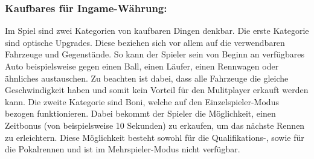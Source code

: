 	\subsubsection*{Kaufbares für Ingame-Währung:}
		Im Spiel sind zwei Kategorien von kaufbaren Dingen denkbar. Die erste Kategorie sind optische Upgrades. Diese beziehen sich vor allem auf die verwendbaren Fahrzeuge und Gegenstände. So kann der Spieler sein von Beginn an verfügbares Auto beispielsweise gegen einen Ball, einen Läufer, einen Rennwagen oder ähnliches austauschen. Zu beachten ist dabei, dass alle Fahrzeuge die gleiche Geschwindigkeit haben und somit kein Vorteil für den Mulitplayer erkauft werden kann. Die zweite Kategorie sind Boni, welche auf den Einzelspieler-Modus bezogen funktionieren. Dabei bekommt der Spieler die Möglichkeit, einen Zeitbonus (von beispielsweise 10 Sekunden) zu erkaufen, um das nächste Rennen zu erleichtern. Diese Möglichkeit besteht sowohl für die Qualifikations-, sowie für die Pokalrennen und ist im Mehrspieler-Modus nicht verfügbar.

